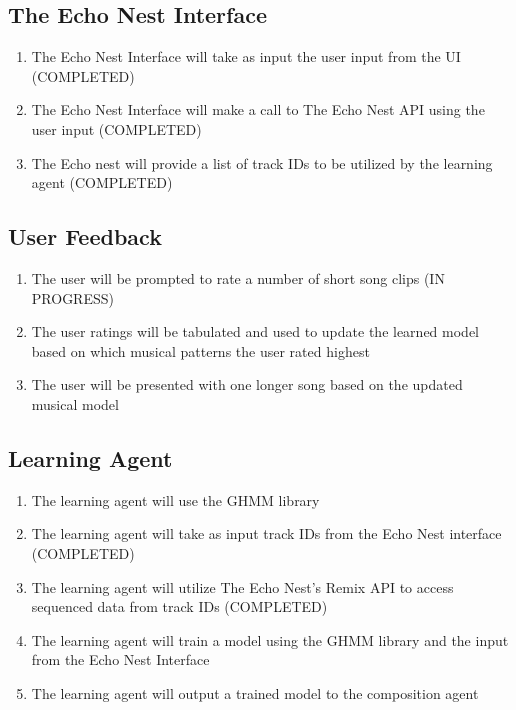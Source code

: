 \documentclass{article}
\begin{document}
\subsection{The Echo Nest Interface}
\begin{enumerate}
\item The Echo Nest Interface will take as input the user input from the UI (COMPLETED)
\item The Echo Nest Interface will make a call to The Echo Nest API using the user input (COMPLETED)
\item The Echo nest will provide a list of track IDs to be utilized by the learning agent (COMPLETED)
\end{enumerate}

\subsection{User Feedback}
\begin{enumerate}
\item The user will be prompted to rate a number of short song clips (IN PROGRESS)
\item The user ratings will be tabulated and used to update the learned model based on which musical patterns the user rated highest
\item The user will be presented with one longer song based on the updated musical model
\end{enumerate}

\subsection{Learning Agent}
\begin{enumerate}
\item The learning agent will use the GHMM library
\item The learning agent will take as input track IDs from the Echo Nest interface (COMPLETED)
\item The learning agent will utilize The Echo Nest's Remix API \cite{Remix} to access sequenced data from track IDs (COMPLETED)
\item The learning agent will train a model using the GHMM library and the input from the Echo Nest Interface 
\item The learning agent will output a trained model to the composition agent 
\end{enumerate}
\end{document}
